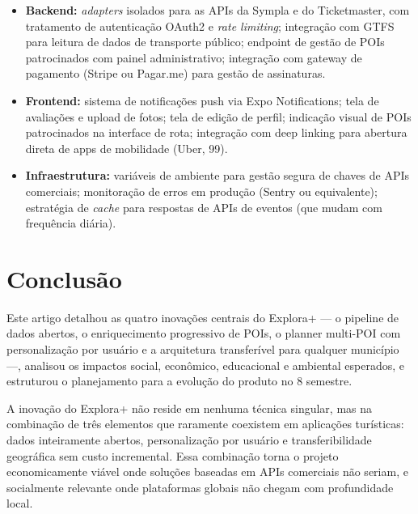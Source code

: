 \documentclass[12pt, a4paper]{article}
\begin{document}
\begin{itemize}
  \item \textbf{Backend:} \textit{adapters} isolados para as APIs da Sympla e do Ticketmaster, com tratamento de autentica\c{c}\~ao OAuth2 e \textit{rate limiting}; integra\c{c}\~ao com GTFS para leitura de dados de transporte p\'ublico; endpoint de gest\~ao de POIs patrocinados com painel administrativo; integra\c{c}\~ao com gateway de pagamento (Stripe ou Pagar.me) para gest\~ao de assinaturas.

  \item \textbf{Frontend:} sistema de notifica\c{c}\~oes push via Expo Notifications; tela de avalia\c{c}\~oes e upload de fotos; tela de edi\c{c}\~ao de perfil; indica\c{c}\~ao visual de POIs patrocinados na interface de rota; integra\c{c}\~ao com deep linking para abertura direta de apps de mobilidade (Uber, 99).

  \item \textbf{Infraestrutura:} vari\'aveis de ambiente para gest\~ao segura de chaves de APIs comerciais; monitora\c{c}\~ao de erros em produ\c{c}\~ao (Sentry ou equivalente); estrat\'egia de \textit{cache} para respostas de APIs de eventos (que mudam com frequ\^encia di\'aria).
\end{itemize}

\section{Conclus\~ao}

Este artigo detalhou as quatro inova\c{c}\~oes centrais do Explora+ --- o pipeline de dados abertos, o enriquecimento progressivo de POIs, o planner multi-POI com personaliza\c{c}\~ao por usu\'ario e a arquitetura transfer\'ivel para qualquer munic\'ipio ---, analisou os impactos social, econ\^omico, educacional e ambiental esperados, e estruturou o planejamento para a evolu\c{c}\~ao do produto no 8\textordmasculine{} semestre.

A inova\c{c}\~ao do Explora+ n\~ao reside em nenhuma t\'ecnica singular, mas na combina\c{c}\~ao de tr\^es elementos que raramente coexistem em aplica\c{c}\~oes tur\'isticas: dados inteiramente abertos, personaliza\c{c}\~ao por usu\'ario e transferibilidade geogr\'afica sem custo incremental. Essa combina\c{c}\~ao torna o projeto economicamente vi\'avel onde solu\c{c}\~oes baseadas em APIs comerciais n\~ao seriam, e socialmente relevante onde plataformas globais n\~ao chegam com profundidade local.
\end{document}
